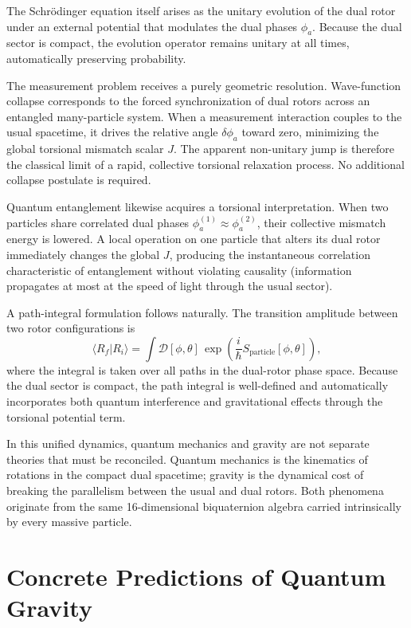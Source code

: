 \documentclass[dvipdfmx,11pt,a4paper]{article}
\begin{document}
The Schrödinger equation itself arises as the unitary evolution of the dual rotor under an external potential that modulates the dual phases $\phi_a$. Because the dual sector is compact, the evolution operator remains unitary at all times, automatically preserving probability.

The measurement problem receives a purely geometric resolution. Wave-function collapse corresponds to the forced synchronization of dual rotors across an entangled many-particle system. When a measurement interaction couples to the usual spacetime, it drives the relative angle $\delta\phi_a$ toward zero, minimizing the global torsional mismatch scalar $J$. The apparent non-unitary jump is therefore the classical limit of a rapid, collective torsional relaxation process. No additional collapse postulate is required.

Quantum entanglement likewise acquires a torsional interpretation. When two particles share correlated dual phases $\phi_a^{(1)} \approx \phi_a^{(2)}$, their collective mismatch energy is lowered. A local operation on one particle that alters its dual rotor immediately changes the global $J$, producing the instantaneous correlation characteristic of entanglement without violating causality (information propagates at most at the speed of light through the usual sector).

A path-integral formulation follows naturally. The transition amplitude between two rotor configurations is
\[
\langle R_f | R_i \rangle = \int \mathcal{D}[\phi,\theta] \, \exp\left( \frac{i}{\hbar} S_\text{particle}[\phi,\theta] \right),
\]
where the integral is taken over all paths in the dual-rotor phase space. Because the dual sector is compact, the path integral is well-defined and automatically incorporates both quantum interference and gravitational effects through the torsional potential term.

In this unified dynamics, quantum mechanics and gravity are not separate theories that must be reconciled. Quantum mechanics is the kinematics of rotations in the compact dual spacetime; gravity is the dynamical cost of breaking the parallelism between the usual and dual rotors. Both phenomena originate from the same 16-dimensional biquaternion algebra carried intrinsically by every massive particle.

\section{Concrete Predictions of Quantum Gravity}
\label{sec:predictions}
\end{document}
